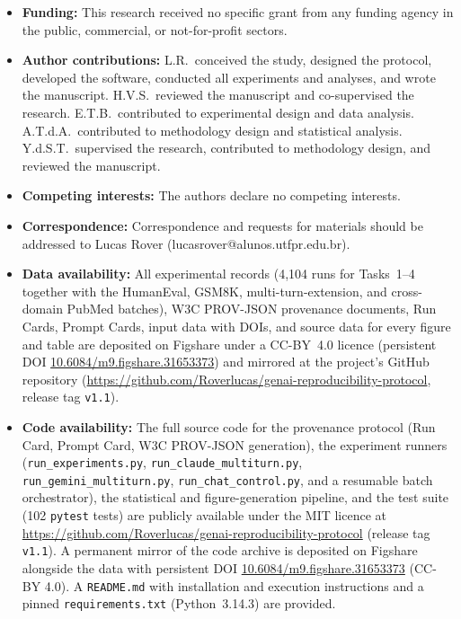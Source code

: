 \documentclass[sn-nature]{sn-jnl}
\begin{document}
\begin{itemize}
\item \textbf{Funding:}
This research received no specific grant from any funding agency in the public, commercial, or not-for-profit sectors.

\item \textbf{Author contributions:}
L.R.\ conceived the study, designed the protocol, developed the software, conducted all experiments and analyses, and wrote the manuscript.
H.V.S.\ reviewed the manuscript and co-supervised the research.
E.T.B.\ contributed to experimental design and data analysis.
A.T.d.A.\ contributed to methodology design and statistical analysis.
Y.d.S.T.\ supervised the research, contributed to methodology design, and reviewed the manuscript.

\item \textbf{Competing interests:}
The authors declare no competing interests.

\item \textbf{Correspondence:}
Correspondence and requests for materials should be addressed to Lucas Rover (lucasrover@alunos.utfpr.edu.br).

\item \textbf{Data availability:}
All experimental records (4{,}104 runs for Tasks~1--4 together with the HumanEval, GSM8K, multi-turn-extension, and cross-domain PubMed batches), W3C PROV-JSON provenance documents, Run Cards, Prompt Cards, input data with DOIs, and source data for every figure and table are deposited on Figshare under a CC-BY~4.0 licence (persistent DOI \href{https://doi.org/10.6084/m9.figshare.31653373}{10.6084/m9.figshare.31653373}) and mirrored at the project's GitHub repository (\url{https://github.com/Roverlucas/genai-reproducibility-protocol}, release tag \texttt{v1.1}).

\item \textbf{Code availability:}
The full source code for the provenance protocol (Run Card, Prompt Card, W3C PROV-JSON generation), the experiment runners (\texttt{run\_experiments.py}, \texttt{run\_claude\_multiturn.py}, \texttt{run\_gemini\_multiturn.py}, \texttt{run\_chat\_control.py}, and a resumable batch orchestrator), the statistical and figure-generation pipeline, and the test suite (102 \texttt{pytest} tests) are publicly available under the MIT licence at \url{https://github.com/Roverlucas/genai-reproducibility-protocol} (release tag \texttt{v1.1}). A permanent mirror of the code archive is deposited on Figshare alongside the data with persistent DOI \href{https://doi.org/10.6084/m9.figshare.31653373}{10.6084/m9.figshare.31653373} (CC-BY 4.0). A \texttt{README.md} with installation and execution instructions and a pinned \texttt{requirements.txt} (Python~3.14.3) are provided.
\end{itemize}
\end{document}
